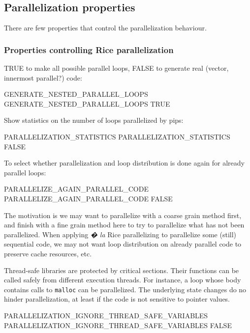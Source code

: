 \documentclass[a4paper]{report}
\begin{document}
\subsection{Parallelization properties}


There are few properties that control the parallelization behaviour.

\subsubsection{Properties controlling Rice parallelization}

TRUE to make all possible parallel loops, FALSE to generate real (vector,
innermost parallel?) code:
\begin{PipsProp}{GENERATE_NESTED_PARALLEL_LOOPS}
GENERATE_NESTED_PARALLEL_LOOPS TRUE
\end{PipsProp}

Show statistics on the number of loops parallelized by pips:
\begin{PipsProp}{PARALLELIZATION_STATISTICS}
PARALLELIZATION_STATISTICS FALSE
\end{PipsProp}


To select whether parallelization and loop distribution is done again for
already parallel loops:
\begin{PipsProp}{PARALLELIZE_AGAIN_PARALLEL_CODE}
PARALLELIZE_AGAIN_PARALLEL_CODE FALSE
\end{PipsProp}
The motivation is we may want to parallelize with a coarse grain method
first, and finish with a fine grain method here to try to parallelize what
has not been parallelized.  When applying \emph{� la} Rice parallelizing
to parallelize some (still) sequential code, we may not want loop
distribution on already parallel code to preserve cache resources, etc.

Thread-safe libraries are protected by critical sections. Their
functions can be called safely from different execution threads. For
instance, a loop whose body contains calls to \verb/malloc/ can be
parallelized. The underlying state changes do no hinder
parallelization, at least if the code is not sensitive to pointer
values.

\begin{PipsProp}{PARALLELIZATION_IGNORE_THREAD_SAFE_VARIABLES}
PARALLELIZATION_IGNORE_THREAD_SAFE_VARIABLES FALSE
\end{PipsProp}
\end{document}
